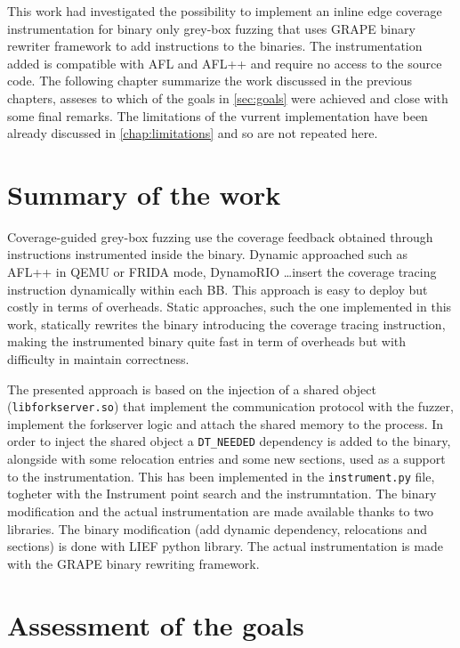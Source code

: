 This work had investigated the possibility to implement an inline edge coverage instrumentation for binary only 
grey-box fuzzing that uses GRAPE binary rewriter framework to add instructions to the binaries.
The instrumentation added is compatible with AFL and AFL++ and require no access to the source code.
The following chapter summarize the work discussed in the previous chapters, asseses to which of the goals 
in \cref{sec:goals} were achieved and close with some final remarks.
The limitations of the vurrent implementation have been already discussed in \cref{chap:limitations} and so are not 
repeated here.

\section{Summary of the work}\label{sec:summary}

    Coverage-guided grey-box fuzzing use the coverage feedback obtained through instructions instrumented inside the binary. 
    Dynamic approached such as AFL++ in QEMU or FRIDA mode, DynamoRIO \dots insert the coverage tracing instruction 
    dynamically within each \gls{BB}. This approach is easy to deploy but costly in terms of overheads.
    Static approaches, such the one implemented in this work, statically rewrites the binary introducing 
    the coverage tracing instruction, making the instrumented binary quite fast in term of overheads but with 
    difficulty in maintain correctness.

    The presented approach is based on the injection of a shared object (\texttt{libforkserver.so}) that implement 
    the communication protocol with the fuzzer, implement the forkserver logic and attach the shared memory to the process.
    In order to inject the shared object a \texttt{DT\_NEEDED} dependency is added to the binary, alongside with 
    some relocation entries and some new sections, used as a support to the instrumentation. 
    This has been implemented in the \texttt{instrument.py} file, togheter with the Instrument point search and the instrumntation.
    The binary modification and the actual instrumentation are made available thanks to two libraries.
    The binary modification (add dynamic dependency, relocations and sections) is done with LIEF python library.
    The actual instrumentation is made with the GRAPE binary rewriting framework.

\section{Assessment of the goals}\label{sec:goal_assesment}


